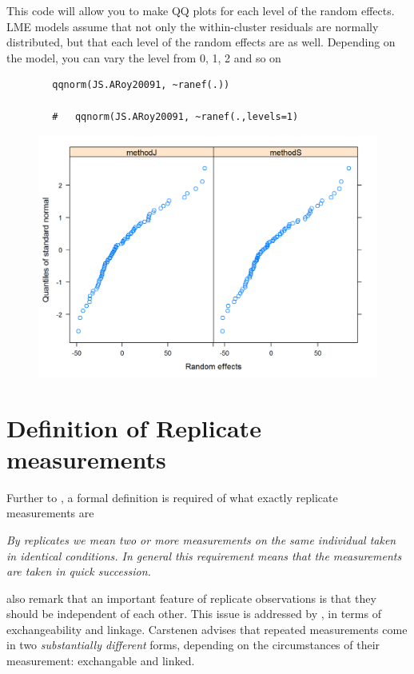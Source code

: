 \documentclass[12pt, a4paper]{report}
\theoremstyle{plain}
\theoremstyle{definition}
\theoremstyle{remark}
\begin{document}
	This code will allow you to make QQ plots for each level of the random effects.  LME models assume that not only the within-cluster residuals are normally distributed, but that each level of the random effects are as well. Depending on the model, you can vary the level from 0, 1, 2 and so on
	\begin{framed}
		\begin{verbatim}
		qqnorm(JS.ARoy20091, ~ranef(.))
		
		# 	qqnorm(JS.ARoy20091, ~ranef(.,levels=1)
		\end{verbatim}
	\end{framed}
	\begin{figure}[h!]
		\centering
		\includegraphics[width=0.9\linewidth]{images/ResidPlot2}
		\caption{}
		\label{fig:ResidPlot2}
	\end{figure}	
	
	\section{Definition of Replicate measurements}
	Further to \citet{BA99}, a formal definition is required of what exactly replicate measurements are
	
	\emph{By replicates we mean two or more measurements on the same
		individual taken in identical conditions. In general this requirement means that the
		measurements are taken in quick succession.}
	
	\citet{BA99} also remark that an important feature of replicate observations is that they should be independent
	of each other. This issue is addressed by \citet{BXC2010}, in terms of exchangeability and linkage. Carstenen advises that repeated measurements come in two \emph{substantially different} forms, depending on the circumstances of their measurement: exchangable and linked.
\end{document}
